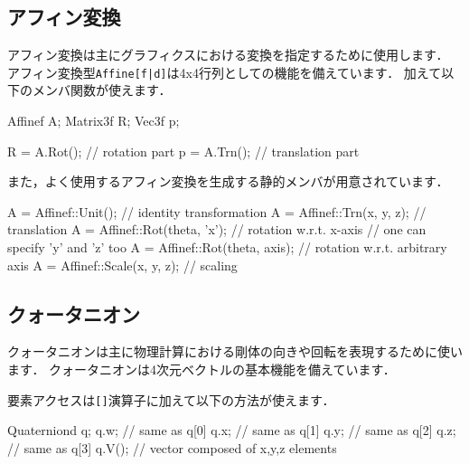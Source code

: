 \subsection*{\KLUDGE アフィン変換}


\KLUDGE アフィン変換は主にグラフィクスにおける変換を指定するために使用します．
\KLUDGE アフィン変換型\texttt{Affine[f|d]}\KLUDGE は4x4\KLUDGE 行列としての機能を備えています．
\KLUDGE 加えて以下のメンバ関数が使えます．
\begin{sourcecode}
Affinef A;
Matrix3f R;
Vec3f p;

R = A.Rot();           // rotation part
p = A.Trn();           // translation part
\end{sourcecode}

\KLUDGE また，よく使用するアフィン変換を生成する静的メンバが用意されています．
\begin{sourcecode}
A = Affinef::Unit();            // identity transformation
A = Affinef::Trn(x, y, z);      // translation
A = Affinef::Rot(theta, 'x');   // rotation w.r.t. x-axis
                                // one can specify 'y' and 'z' too
A = Affinef::Rot(theta, axis);  // rotation w.r.t. arbitrary axis
A = Affinef::Scale(x, y, z);    // scaling
\end{sourcecode}

\subsection*{\KLUDGE クォータニオン}


\KLUDGE クォータニオンは主に物理計算における剛体の向きや回転を表現するために使います．
\KLUDGE クォータニオンは4\KLUDGE 次元ベクトルの基本機能を備えています．

\KLUDGE 要素アクセスは\texttt{[]}\KLUDGE 演算子に加えて以下の方法が使えます．
\begin{sourcecode}
Quaterniond q;
q.w;                   // same as q[0]
q.x;                   // same as q[1]
q.y;                   // same as q[2]
q.z;                   // same as q[3]
q.V();                 // vector composed of x,y,z elements
\end{sourcecode}

